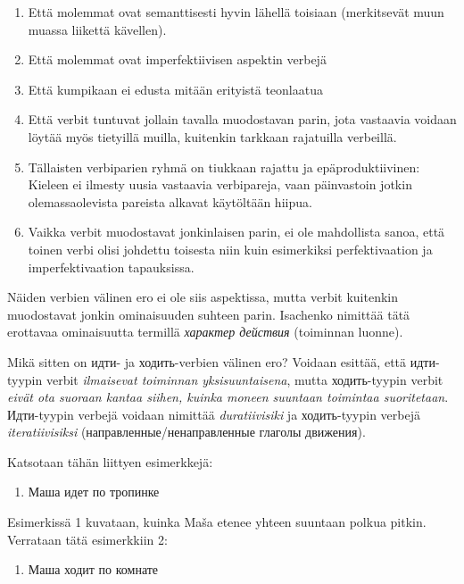 \documentclass[]{scrartcl}
\providecommand{\tightlist}{%
  \setlength{\itemsep}{0pt}\setlength{\parskip}{0pt}}
\begin{document}
\begin{enumerate}
\def\labelenumi{\arabic{enumi}.}
\tightlist
\item
  Että molemmat ovat semanttisesti hyvin lähellä toisiaan (merkitsevät
  muun muassa liikettä kävellen).
\item
  Että molemmat ovat imperfektiivisen aspektin verbejä
\item
  Että kumpikaan ei edusta mitään erityistä teonlaatua
\item
  Että verbit tuntuvat jollain tavalla muodostavan parin, jota vastaavia
  voidaan löytää myös tietyillä muilla, kuitenkin tarkkaan rajatuilla
  verbeillä.
\item
  Tällaisten verbiparien ryhmä on tiukkaan rajattu ja epäproduktiivinen:
  Kieleen ei ilmesty uusia vastaavia verbipareja, vaan päinvastoin
  jotkin olemassaolevista pareista alkavat käytöltään hiipua.
\item
  Vaikka verbit muodostavat jonkinlaisen parin, ei ole mahdollista
  sanoa, että toinen verbi olisi johdettu toisesta niin kuin esimerkiksi
  perfektivaation ja imperfektivaation tapauksissa.
\end{enumerate}

Näiden verbien välinen ero ei ole siis aspektissa, mutta verbit
kuitenkin muodostavat jonkin ominaisuuden suhteen parin. Isachenko
nimittää tätä erottavaa ominaisuutta termillä \emph{характер действия}
(toiminnan luonne).

Mikä sitten on идти- ja ходить-verbien välinen ero? Voidaan esittää,
että идти-tyypin verbit \emph{ilmaisevat toiminnan yksisuuntaisena},
mutta ходить-tyypin verbit \emph{eivät ota suoraan kantaa siihen, kuinka
moneen suuntaan toimintaa suoritetaan}. Идти-tyypin verbejä voidaan
nimittää \emph{duratiivisiki} ja ходить-tyypin verbejä
\emph{iteratiivisiksi} (направленные/ненаправленные глаголы движения).

Katsotaan tähän liittyen esimerkkejä:

\begin{enumerate}
\def\labelenumi{(\arabic{enumi})}
\tightlist
\item
  Маша идет по тропинке
\end{enumerate}

Esimerkissä 1 kuvataan, kuinka Maša etenee yhteen suuntaan polkua
pitkin. Verrataan tätä esimerkkiin 2:

\begin{enumerate}
\def\labelenumi{(\arabic{enumi})}
\setcounter{enumi}{1}
\tightlist
\item
  Маша ходит по комнате
\end{enumerate}
\end{document}

